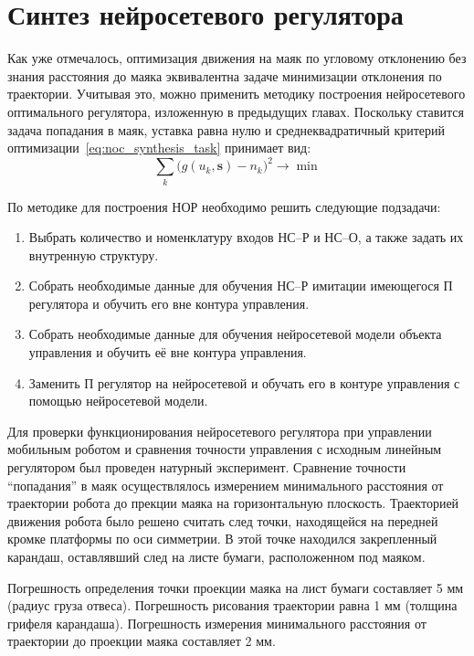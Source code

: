 \section{Синтез нейросетевого регулятора}

Как уже отмечалось, оптимизация движения на маяк по угловому
отклонению без знания расстояния до маяка эквивалентна задаче
минимизации отклонения по траектории.  Учитывая это, можно применить
методику построения нейросетевого оптимального регулятора, изложенную
в предыдущих главах.  Поскольку ставится задача попадания в маяк,
уставка равна нулю и среднеквадратичный критерий
оптимизации~\eqref{eq:noc_synthesis_task} принимает вид:
\begin{equation}\label{eq:mobot-task}
  \sum\limits_k\big(g(u_k,\mathbf{s})-n_k\big)^2\rightarrow\min
\end{equation}

По методике для построения НОР необходимо решить следующие подзадачи:
\begin{enumerate}
\item Выбрать количество и номенклатуру входов НС--Р и НС--О, а также
      задать их внутренную структуру.

\item Собрать необходимые данные для обучения НС--Р имитации имеющегося
      П регулятора и обучить его вне контура управления.

\item Собрать необходимые данные для обучения нейросетевой модели
      объекта управления и обучить её вне контура управления.

\item Заменить П регулятор на нейросетевой и обучать его в контуре
      управления с помощью нейросетевой модели.
\end{enumerate}

Для проверки функционирования нейросетевого регулятора при управлении
мобильным роботом и сравнения точности управления с исходным линейным
регулятором был проведен натурный эксперимент.  Сравнение точности
``попадания'' в маяк осуществлялось измерением минимального расстояния
от траектории робота до прекции маяка на горизонтальную плоскость.
Траекторией движения робота было решено считать след точки,
находящейся на передней кромке платформы по оси симметрии.  В этой
точке находился закрепленный карандаш, оставлявший след на листе
бумаги, расположенном под маяком.

Погрешность определения точки проекции маяка на лист бумаги составляет
5 мм (радиус груза отвеса).  Погрешность рисования траектории равна 1
мм (толщина грифеля карандаша).  Погрешность измерения минимального
расстояния от траектории до проекции маяка составляет 2 мм.

